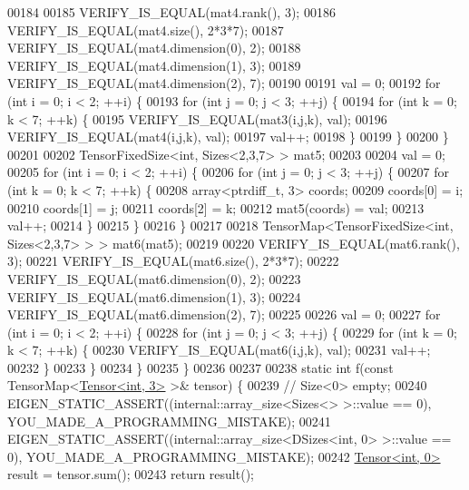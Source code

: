 \begin{DoxyCode}
00184 
00185   VERIFY\_IS\_EQUAL(mat4.rank(), 3);
00186   VERIFY\_IS\_EQUAL(mat4.size(), 2*3*7);
00187   VERIFY\_IS\_EQUAL(mat4.dimension(0), 2);
00188   VERIFY\_IS\_EQUAL(mat4.dimension(1), 3);
00189   VERIFY\_IS\_EQUAL(mat4.dimension(2), 7);
00190 
00191   val = 0;
00192   \textcolor{keywordflow}{for} (\textcolor{keywordtype}{int} i = 0; i < 2; ++i) \{
00193     \textcolor{keywordflow}{for} (\textcolor{keywordtype}{int} j = 0; j < 3; ++j) \{
00194       \textcolor{keywordflow}{for} (\textcolor{keywordtype}{int} k = 0; k < 7; ++k) \{
00195         VERIFY\_IS\_EQUAL(mat3(i,j,k), val);
00196         VERIFY\_IS\_EQUAL(mat4(i,j,k), val);
00197         val++;
00198       \}
00199     \}
00200   \}
00201 
00202   TensorFixedSize<int, Sizes<2,3,7> > mat5;
00203 
00204   val = 0;
00205   \textcolor{keywordflow}{for} (\textcolor{keywordtype}{int} i = 0; i < 2; ++i) \{
00206     \textcolor{keywordflow}{for} (\textcolor{keywordtype}{int} j = 0; j < 3; ++j) \{
00207       \textcolor{keywordflow}{for} (\textcolor{keywordtype}{int} k = 0; k < 7; ++k) \{
00208         array<ptrdiff\_t, 3> coords;
00209         coords[0] = i;
00210         coords[1] = j;
00211         coords[2] = k;
00212         mat5(coords) = val;
00213         val++;
00214       \}
00215     \}
00216   \}
00217 
00218   TensorMap<TensorFixedSize<int, Sizes<2,3,7> > > mat6(mat5);
00219 
00220   VERIFY\_IS\_EQUAL(mat6.rank(), 3);
00221   VERIFY\_IS\_EQUAL(mat6.size(), 2*3*7);
00222   VERIFY\_IS\_EQUAL(mat6.dimension(0), 2);
00223   VERIFY\_IS\_EQUAL(mat6.dimension(1), 3);
00224   VERIFY\_IS\_EQUAL(mat6.dimension(2), 7);
00225 
00226   val = 0;
00227   \textcolor{keywordflow}{for} (\textcolor{keywordtype}{int} i = 0; i < 2; ++i) \{
00228     \textcolor{keywordflow}{for} (\textcolor{keywordtype}{int} j = 0; j < 3; ++j) \{
00229       \textcolor{keywordflow}{for} (\textcolor{keywordtype}{int} k = 0; k < 7; ++k) \{
00230         VERIFY\_IS\_EQUAL(mat6(i,j,k), val);
00231         val++;
00232       \}
00233     \}
00234   \}
00235 \}
00236 
00237 
00238 \textcolor{keyword}{static} \textcolor{keywordtype}{int} f(\textcolor{keyword}{const} TensorMap<\hyperlink{class_eigen_1_1_tensor}{Tensor<int, 3>} >& tensor) \{
00239   \textcolor{comment}{//  Size<0> empty;}
00240   EIGEN\_STATIC\_ASSERT((internal::array\_size<Sizes<> >::value == 0), YOU\_MADE\_A\_PROGRAMMING\_MISTAKE);
00241   EIGEN\_STATIC\_ASSERT((internal::array\_size<DSizes<int, 0> >::value == 0), YOU\_MADE\_A\_PROGRAMMING\_MISTAKE);
00242   \hyperlink{class_eigen_1_1_tensor}{Tensor<int, 0>} result = tensor.sum();
00243   \textcolor{keywordflow}{return} result();

\end{DoxyCode}

